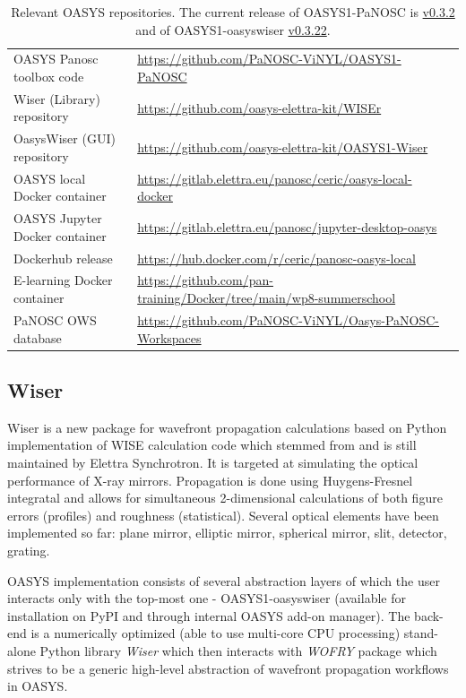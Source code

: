 \documentclass[11pt, a4paper]{article}
\begin{document}
\begin{table}[ht]
  \label{tab:repos}
  \centering
  \begin{center}
    \caption{Relevant OASYS repositories. The current release of OASYS1-PaNOSC is \href{https://pypi.org/project/OASYS1-PaNOSC/0.3.2/}{v0.3.2} and of OASYS1-oasyswiser \href{https://pypi.org/project/OASYS1-oasyswiser/0.3.22/}{v0.3.22}.}
    \begin{tabular}{l p{10cm}l}
      \hline
      OASYS Panosc toolbox code & \url{https://github.com/PaNOSC-ViNYL/OASYS1-PaNOSC} \\
      Wiser (Library) repository & \url{https://github.com/oasys-elettra-kit/WISEr} \\
      OasysWiser (GUI) repository & \url{https://github.com/oasys-elettra-kit/OASYS1-Wiser} \\
      OASYS local Docker container & \url{https://gitlab.elettra.eu/panosc/ceric/oasys-local-docker} \\
      OASYS Jupyter Docker container & \url{https://gitlab.elettra.eu/panosc/jupyter-desktop-oasys} \\
      Dockerhub release & \url{https://hub.docker.com/r/ceric/panosc-oasys-local}\\
      E-learning Docker container & \url{https://github.com/pan-training/Docker/tree/main/wp8-summerschool} \\
      PaNOSC OWS database & \url{https://github.com/PaNOSC-ViNYL/Oasys-PaNOSC-Workspaces} \\
      \hline
    \end{tabular}
  \end{center}
\end{table}

\subsection{Wiser}

Wiser is a new package for wavefront propagation calculations based on Python implementation of WISE calculation code which stemmed from and is still maintained by Elettra Synchrotron. It is targeted at simulating the optical performance of X-ray mirrors. Propagation is done using Huygens-Fresnel integratal and allows for simultaneous 2-dimensional calculations of both figure errors (profiles) and roughness (statistical). Several optical elements have been implemented so far: plane mirror, elliptic mirror, spherical mirror, slit, detector, grating.

OASYS implementation consists of several abstraction layers of which the user interacts only with the top-most one - OASYS1-oasyswiser (available for installation on PyPI and through internal OASYS add-on manager). The back-end is a numerically optimized (able to use multi-core CPU processing) stand-alone Python library \emph{Wiser} which then interacts with \emph{WOFRY} package which strives to be a generic high-level abstraction of wavefront propagation workflows in OASYS. 
\end{document}
